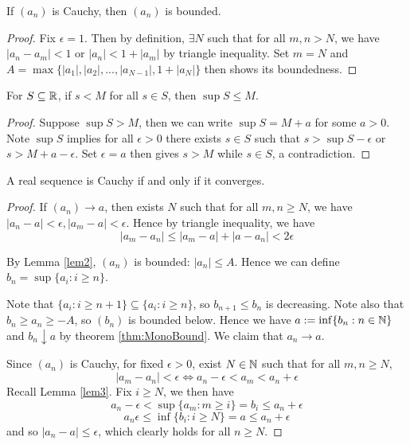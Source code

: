 \documentclass[11pt]{article}
\begin{document}
\begin{lemma}
  \label{lem2}
  If \((a_n)\) is Cauchy, then \((a_n)\) is bounded.
\end{lemma}
\begin{proof}
  Fix \(\epsilon=1\). Then by definition, \(\exists N\) such that for all \(m,n>N\), we have \(|a_n-a_m|<1\) or \(|a_n|<1+|a_m|\) by triangle inequality. Set \(m=N\) and \(A=\max\{|a_1|,|a_2|,...,|a_{N-1}|,1+|a_N|\}\) then shows its boundedness.
\end{proof}

\begin{lemma}
  \label{lem3}
  For \(S\subseteq\mathbb{R}\), if \(s<M\) for all \(s\in S\), then \(\sup S\leq M\).
\end{lemma}
\begin{proof}
  Suppose \(\sup S>M\), then we can write \(\sup S=M+a\) for some \(a>0\). Note \(\sup S\) implies for all \(\epsilon >0\) there exists \(s\in S\) such that \(s>\sup S-\epsilon\) or \(s>M+a-\epsilon\). Set \(\epsilon=a\) then gives \(s>M\) while \(s\in S\), a contradiction.
\end{proof}

\begin{theorem}
  A real sequence is Cauchy if and only if it converges.
\end{theorem}
\begin{proof}
  \subproof{\(\impliedby\)}
  If \((a_n)\to a\), then exists \(N\) such that for all \(m,n\geq N\), we have \(|a_n-a|<\epsilon, |a_m-a|<\epsilon\). Hence by triangle inequality, we have \[|a_m-a_n|\leq |a_m-a|+|a-a_n|<2\epsilon\]

  \subproof{\(\implies\)}
  By Lemma \ref{lem2}, \((a_n)\) is bounded: \(|a_n|\leq A\). Hence we can define \(b_n=\sup\{a_i:i\geq n\}\). 

  Note that \(\{a_i:i\geq n+1\}\subseteq \{a_i:i\geq n\}\), so \(b_{n+1}\leq b_n\) is decreasing. Note also that \(b_n\geq a_n\geq -A\), so \((b_n)\) is bounded below. Hence we have \(a:=\inf\{b_n:n\in\mathbb{N}\}\) and \(b_n\downarrow a\) by theorem \ref{thm:MonoBound}. We claim that \(a_n\to a\).

  Since \((a_n)\) is Cauchy, for fixed \(\epsilon >0\), exist \(N\in\mathbb{N}\) such that for all \(m,n\geq N\),
  \[|a_m-a_n|<\epsilon \iff a_n-\epsilon<a_m<a_n+\epsilon\]
  Recall Lemma \ref{lem3}. Fix \(i\geq N\), we then have
  \[a_n-\epsilon<\sup\{a_m:m\geq i\}=b_i\leq a_n+\epsilon\]
  \[a_n\epsilon\leq\inf\{b_i:i\geq N\}=a\leq a_n+\epsilon\]
  and so \(|a_n-a|\leq\epsilon\), which clearly holds for all \(n\geq N\).
\end{proof}
\end{document}

